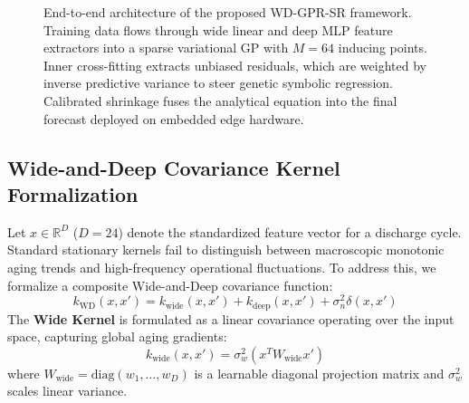 \documentclass[a4paper,fleqn]{cas-sc}
\begin{document}
\begin{figure}[t]
\caption{End-to-end architecture of the proposed WD-GPR-SR framework. Training data flows through wide linear and deep MLP feature extractors into a sparse variational GP with $M=64$ inducing points. Inner cross-fitting extracts unbiased residuals, which are weighted by inverse predictive variance to steer genetic symbolic regression. Calibrated shrinkage fuses the analytical equation into the final forecast deployed on embedded edge hardware.}
\label{fig:tikz_architecture}
\end{figure}

\subsection{Wide-and-Deep Covariance Kernel Formalization}
Let $x \in \mathbb{R}^D$ ($D=24$) denote the standardized feature vector for a discharge cycle. Standard stationary kernels fail to distinguish between macroscopic monotonic aging trends and high-frequency operational fluctuations. To address this, we formalize a composite Wide-and-Deep covariance function:
\begin{equation}
    k_{\text{WD}}(x, x') = k_{\text{wide}}(x, x') + k_{\text{deep}}(x, x') + \sigma_n^2 \delta(x, x')
\end{equation}
The \textbf{Wide Kernel} is formulated as a linear covariance operating over the input space, capturing global aging gradients:
\begin{equation}
    k_{\text{wide}}(x, x') = \sigma_w^2 (x^T W_{\text{wide}} x')
\end{equation}
where $W_{\text{wide}} = \text{diag}(w_1, \dots, w_D)$ is a learnable diagonal projection matrix and $\sigma_w^2$ scales linear variance.
\end{document}
